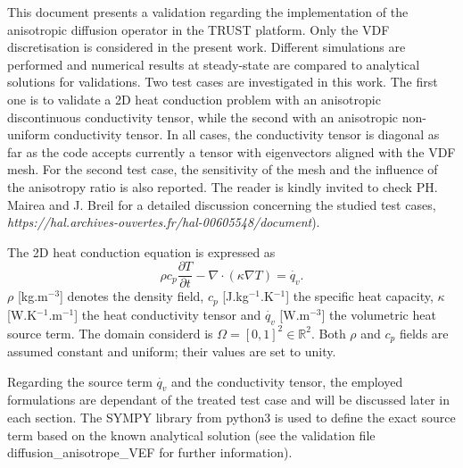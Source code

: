 This document presents a validation regarding the implementation of the anisotropic diffusion operator in the TRUST platform. Only the VDF discretisation is considered in the present work. Different simulations are performed and numerical results at steady-state are compared to analytical solutions for validations. Two test cases are investigated in this work. The first one is to validate a 2D heat conduction problem with an anisotropic discontinuous conductivity tensor, while the second with an anisotropic non-uniform conductivity tensor. In all cases, the conductivity tensor is diagonal as far as the code accepts currently a tensor with eigenvectors aligned with the VDF mesh.  For the second test case, the sensitivity of the mesh and the influence of the anisotropy ratio is also reported. The reader is kindly invited to check PH. Mairea and J. Breil for a detailed discussion concerning the studied test cases, \textit{https://hal.archives-ouvertes.fr/hal-00605548/document}).

The 2D heat conduction equation is expressed as
\begin{equation}\label{cond}
\rho c_p \frac{\partial T}{\partial t} - \nabla\cdot (\kappa\nabla T)=\dot{q_v}.
\end{equation}
$\rho$ [kg.m$^{-3}$] denotes the density field, $c_p$ [J.kg$^{-1}$.K$^{-1}$] the specific heat capacity, $\kappa$ [W.K$^{-1}$.m$^{-1}$] the heat conductivity tensor and $\dot{q_v}$ [W.m$^{-3}$] the volumetric heat source term. The domain considerd is $\Omega=[0,1]^2 \in \mathbb{R}^2$. Both $\rho$ and $c_p$ fields are assumed constant and uniform; their values are set to unity. 

Regarding the source term $\dot{q_v}$ and the conductivity tensor, the employed formulations are dependant of the treated test case and will be discussed later in each section. The SYMPY library from python3 is used to define the exact source term based on the known analytical solution (see the validation file diffusion\_anisotrope\_VEF for further information).

